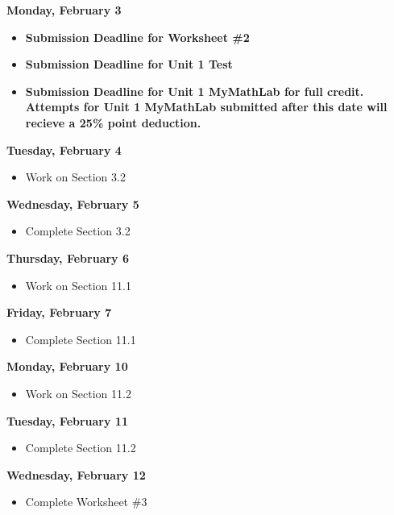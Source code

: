 \documentclass[11pt]{article}
\begin{document}
\textbf{Monday, February 3}

\begin{itemize}
\item \textbf{Submission Deadline for Worksheet \#2}
\item \textbf{Submission Deadline for Unit 1 Test}
\item \textbf{Submission Deadline for Unit 1 MyMathLab for full credit. Attempts for Unit 1 MyMathLab submitted after this date will recieve a 25\% point deduction.}
\end{itemize}

\textbf{Tuesday, February 4}

\begin{itemize}
\item Work on Section 3.2
\end{itemize}

\textbf{Wednesday, February 5}

\begin{itemize}
\item Complete Section 3.2
\end{itemize}

\textbf{Thursday, February 6}

\begin{itemize}
\item Work on Section 11.1
\end{itemize}

\textbf{Friday, February 7}

\begin{itemize}
\item Complete Section 11.1
\end{itemize}

\textbf{Monday, February 10}

\begin{itemize}
\item Work on Section 11.2
\end{itemize}

\textbf{Tuesday, February 11}

\begin{itemize}
\item Complete Section 11.2
\end{itemize}

\textbf{Wednesday, February 12}

\begin{itemize}
\item Complete Worksheet \#3
\end{itemize}
\end{document}
